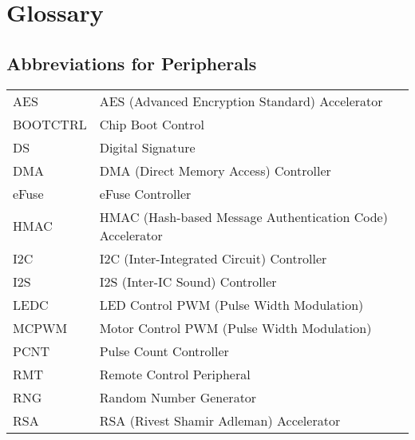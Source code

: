 \chapter*{Glossary}\label{glossary}

\section*{Abbreviations for Peripherals}

\begin{longtable}[c]{ R{3cm} p{12cm} }

AES     & AES (Advanced Encryption Standard) Accelerator \\
BOOTCTRL & Chip Boot Control \\ %
DS      & Digital Signature\\ %
DMA     & DMA (Direct Memory Access) Controller \\
eFuse   & eFuse Controller \\ 
HMAC    & HMAC (Hash-based Message Authentication Code) Accelerator \\ %
I2C     & I2C (Inter-Integrated Circuit) Controller \\ %
I2S     & I2S (Inter-IC Sound) Controller \\ %
LEDC    & LED Control PWM (Pulse Width Modulation)\\ %
MCPWM   & Motor Control PWM (Pulse Width Modulation) \\ 
PCNT & Pulse Count Controller \\
RMT     & Remote Control Peripheral \\
RNG     & Random Number Generator \\
RSA     & RSA (Rivest Shamir Adleman) Accelerator \\

\end{longtable}
